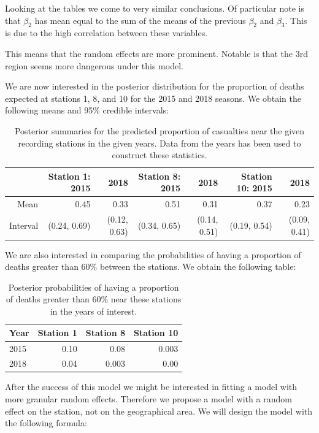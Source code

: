 \documentclass[12pt]{extarticle}
\begin{document}
Looking at the tables we come to very similar conclusions. Of particular note is that $\beta_2$ has mean equal to the sum of the means of the previous $\beta_2$ and $\beta_3$. This is due to the high correlation between these variables. 

This means that the random effects are more prominent. Notable is that the 3rd region seems more dangerous under this model. 

We are now interested in the posterior distribution for the proportion of deaths expected at stations 1, 8, and 10 for the 2015 and 2018 seasons. We obtain the following means and 95\% credible intervals:

\begin{table}[ht]
	\centering
	\footnotesize
	\begin{tabular}{r|rr|rr|rr}
			\hline
			& Station 1: 2015 & 2018 & Station 8: 2015 & 2018 & Station 10: 2015 & 2018 \\
			\hline
			Mean & 0.45 & 0.33 & 0.51 & 0.31 & 0.37 & 0.23 \\
			Interval & (0.24, 0.69) & (0.12, 0.63) & (0.34, 0.65) & (0.14, 0.51) & (0.19, 0.54) & (0.09, 0.41)\\
			\hline
	\end{tabular}
\caption{Posterior summaries for the predicted proportion of casualties near the given recording stations in the given years. Data from the years has been used to construct these statistics.}
\label{tab:postprop}
\end{table}

We are also interested in comparing the probabilities of having a proportion of deaths greater than 60\% between the stations. We obtain the following table:

\begin{table}[ht]
	\centering
	\begin{tabular}{l|r|r|r}
		\hline
		Year & Station 1 & Station 8 & Station 10 \\
		\hline
		2015 & 0.10 & 0.08 & 0.003 \\
		2018 & 0.04 & 0.003 & 0.00 \\
		\hline
	\end{tabular}
	\caption{Posterior probabilities of having a proportion of deaths greater than 60\% near these stations in the years of interest.}
	\label{tab:post_60}
\end{table}

After the success of this model we might be interested in fitting a model with more granular random effects. Therefore we propose a model with a random effect on the station, not on the geographical area. We will design the model with the following formula:
\end{document}
